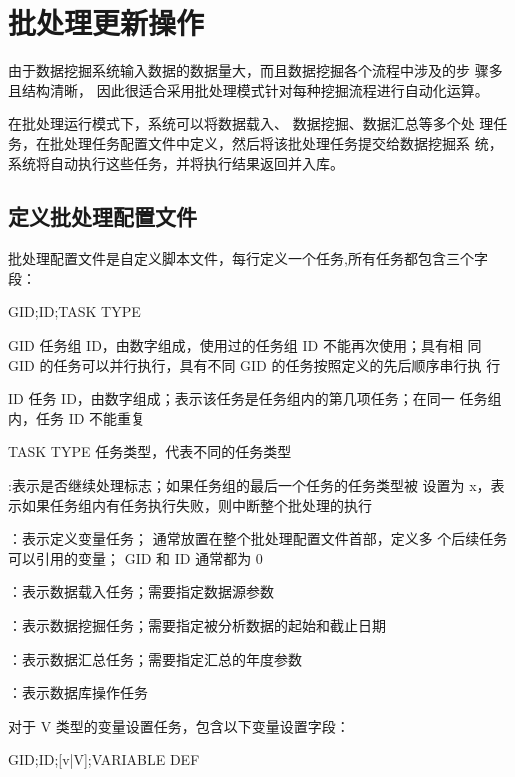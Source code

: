 \section{批处理更新操作}
由于数据挖掘系统输入数据的数据量大，而且数据挖掘各个流程中涉及的步
骤多且结构清晰， 因此很适合采用批处理模式针对每种挖掘流程进行自动化运算。

在批处理运行模式下，系统可以将数据载入、 数据挖掘、数据汇总等多个处
理任务，在批处理任务配置文件中定义，然后将该批处理任务提交给数据挖掘系
统，系统将自动执行这些任务，并将执行结果返回并入库。

\subsection{定义批处理配置文件}
批处理配置文件是自定义脚本文件，每行定义一个任务,所有任务都包含三个字段：

\begin{scriptcode}
GID;ID;TASK TYPE
\end{scriptcode}

\begin{para}
\item[GID] 任务组 ID，由数字组成，使用过的任务组 ID 不能再次使用；具有相
同 GID 的任务可以并行执行，具有不同 GID 的任务按照定义的先后顺序串行执
行
\item[ID] 任务 ID，由数字组成；表示该任务是任务组内的第几项任务；在同一
任务组内，任务 ID 不能重复
\item[TASK TYPE] 任务类型，代表不同的任务类型
\begin{cit}
\item {}:表示是否继续处理标志；如果任务组的最后一个任务的任务类型被
设置为 x，表示如果任务组内有任务执行失败，则中断整个批处理的执行
\item {}：表示定义变量任务； 通常放置在整个批处理配置文件首部，定义多
个后续任务可以引用的变量； GID 和 ID 通常都为 0
\item {}：表示数据载入任务；需要指定数据源参数
\item {}：表示数据挖掘任务；需要指定被分析数据的起始和截止日期
\item {}：表示数据汇总任务；需要指定汇总的年度参数
\item {}：表示数据库操作任务
\end{cit}
\end{para}

对于 V 类型的变量设置任务，包含以下变量设置字段：
\begin{scriptcode}
GID;ID;[v|V];VARIABLE DEF
\end{scriptcode}

